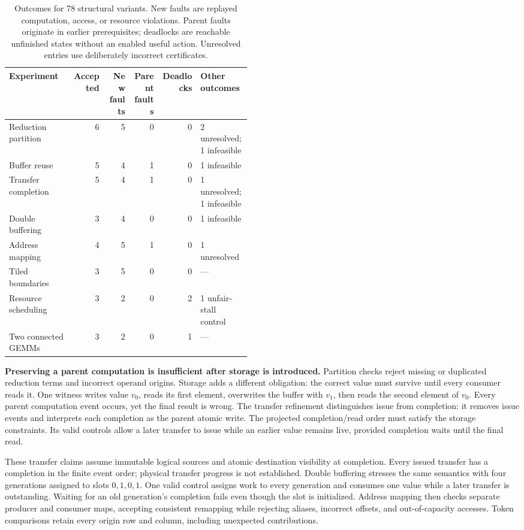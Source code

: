 \documentclass[11pt]{article}
\begin{document}
\begin{table}[ht]
\centering\small
\begin{tabular}{p{0.26\linewidth}rrrrp{0.21\linewidth}}
\toprule
Experiment & Accepted & \shortstack{New\\faults} & \shortstack{Parent\\faults} & Deadlocks & Other outcomes \\
\midrule
Reduction partition & 6 & 5 & 0 & 0 & 2 unresolved; 1 infeasible \\
Buffer reuse & 5 & 4 & 1 & 0 & 1 infeasible \\
Transfer completion & 5 & 4 & 1 & 0 & 1 unresolved; 1 infeasible \\
Double buffering & 3 & 4 & 0 & 0 & 1 infeasible \\
Address mapping & 4 & 5 & 1 & 0 & 1 unresolved \\
Tiled boundaries & 3 & 5 & 0 & 0 & --- \\
Resource scheduling & 3 & 2 & 0 & 2 & 1 unfair-stall control \\
Two connected GEMMs & 3 & 2 & 0 & 1 & --- \\
\bottomrule
\end{tabular}
\caption{Outcomes for 78 structural variants. New faults are replayed computation, access, or resource violations. Parent faults originate in earlier prerequisites; deadlocks are reachable unfinished states without an enabled useful action. Unresolved entries use deliberately incorrect certificates.}\label{tab:structural-results}
\end{table}

\textbf{Preserving a parent computation is insufficient after storage is introduced.}
Partition checks reject missing or duplicated reduction terms and incorrect operand origins. Storage adds a different obligation: the correct value must survive until every consumer reads it. One witness writes value $v_0$, reads its first element, overwrites the buffer with $v_1$, then reads the second element of $v_0$. Every parent computation event occurs, yet the final result is wrong. The transfer refinement distinguishes issue from completion: it removes issue events and interprets each completion as the parent atomic write. The projected completion/read order must satisfy the storage constraints. Its valid controls allow a later transfer to issue while an earlier value remains live, provided completion waits until the final read.

These transfer claims assume immutable logical sources and atomic destination visibility at completion. Every issued transfer has a completion in the finite event order; physical transfer progress is not established. Double buffering stresses the same semantics with four generations assigned to slots $0,1,0,1$. One valid control assigns work to every generation and consumes one value while a later transfer is outstanding. Waiting for an old generation's completion fails even though the slot is initialized. Address mapping then checks separate producer and consumer maps, accepting consistent remapping while rejecting aliases, incorrect offsets, and out-of-capacity accesses. Token comparisons retain every origin row and column, including unexpected contributions.
\end{document}
